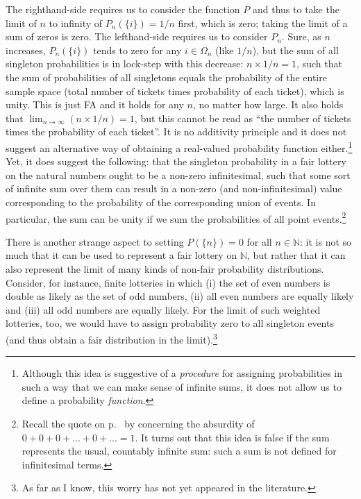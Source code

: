 The righthand-side requires us to consider the function $P$ and thus to take the limit of $n$ to infinity of $P_n(\{i\})=1/n$ first, which is zero; taking the limit of a sum of zeros is zero.
The lefthand-side requires us to consider $P_n$. Sure, as $n$ increases, $P_n(\{i\})$ tends to zero for any $i \in \Omega_n$ (like $1/n$), but the sum of all singleton probabilities is in lock-step with this decrease: $n \times  1/n=1$, such that the sum of probabilities of all singletons equals the probability of the entire sample space (total number of tickets times probability of each ticket), which is unity. This is just FA and it holds for any $n$, no matter how large. It also holds that $\lim_{n\rightarrow\infty} (n \times  1/n)=1$, but this cannot be read as ``the number of tickets times the probability of each ticket''. It is no additivity principle and it does not suggest an alternative way of obtaining a real-valued probability function either.\footnote{Although this idea is suggestive of a \emph{procedure} for assigning probabilities in such a way that we can make sense of infinite sums, it does not allow us to define a probability \emph{function}.}
Yet, it does suggest the following: that the singleton probability in a fair lottery on the natural numbers ought to be a non-zero infinitesimal, such that some sort of infinite sum over them can result in a non-zero (and non-infinitesimal) value corresponding to the probability of the corresponding union of events.
In particular, the sum can be unity if we sum the probabilities of all point events.\footnote{Recall the quote on p.~\pageref{quote:dF} by \citet[p.~347]{deFinetti:1974} concerning the absurdity of $0+0+0+ ... +0+ ... =1$. It turns out that this idea is false if the sum represents the usual, countably infinite sum: such a sum is not defined for infinitesimal terms.}

There is another strange aspect to setting $P(\{n\})=0$ for all $n \in \mathbb{N}$: it is not so much that it can be used to represent a fair lottery on $\mathbb{N}$, but rather that it can also represent the limit of many kinds of non-fair probability distributions. Consider, for instance, finite lotteries in which (i) the set of even numbers is double as likely as the set of odd numbers, (ii) all even numbers are equally likely and (iii) all odd numbers are equally likely. For the limit of such weighted lotteries, too, we would have to assign probability zero to all singleton events (and thus obtain a fair distribution in the limit).\footnote{As far as I know, this worry has not yet appeared in the literature.}

